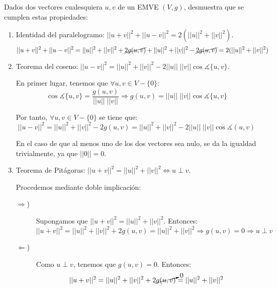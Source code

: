 \begin{ejercicio}
    Dados dos vectores cualesquiera $u,v$ de un EMVE $(V,g)$, desmuestra que se cumplen estas propiedades:
    \begin{enumerate}
        \item Identidad del paralelogramo: $||u+v||^2 +||u-v||^2 = 2\left(||u||^2 + ||v||^2\right)$.
        \begin{equation*}
            ||u+v||^2 + ||u-v||^2 = ||u||^2 + ||v||^2 + \cancel{2g(u,v)} + ||u||^2 + ||v||^2 - \cancel{2g(u,v)} = 2(||u||^2 + ||v||^2)
        \end{equation*}

        \item Teorema del coseno: $||u-v||^2 = ||u||^2+||v||^2 -2||u||\;||v||\cos \measuredangle \{u,v\}$.

        En primer lugar, tenemos que $\forall u,v\in V-\{0\}$:
        \begin{equation*}
            \cos \measuredangle \{u,v\} = \frac{g(u,v)}{||u||\;||v||} \Longrightarrow g(u,v) = ||u||\;||v|| \cos \measuredangle \{u,v\} 
        \end{equation*}

        Por tanto, $\forall u,v\in V-\{0\}$ se tiene que:
        \begin{equation*}
            ||u-v||^2 = ||u||^2 + ||v||^2 -2g(u,v) = ||u||^2+||v||^2 -2||u||\;||v||\cos \measuredangle (u,v)
        \end{equation*}

        En el caso de que al menos uno de los dos vectores sea nulo, se da la igualdad trivialmente, ya que $||0||=0$.

        \item Teorema de Pitágoras: $||u+v||^2 = ||u||^2 + ||v||^2 \Longleftrightarrow u\perp v$.

        Procedemos mediante doble implicación:
        \begin{description}
            \item [$\Longrightarrow$)] Supongamos que $||u+v||^2 = ||u||^2 + ||v||^2$. Entonces:
            \begin{equation*}
                ||u+v||^2 = ||u||^2 + ||v||^2 +2g(u,v) = ||u||^2 + ||v||^2 \Longrightarrow g(u,v)=0 \Longrightarrow u\perp v
            \end{equation*}

            \item [$\Longleftarrow$)] Como $u\perp v$, tenemos que $g(u,v)=0$. Entonces:
            \begin{equation*}
                ||u+v||^2 = ||u||^2 + ||v||^2 +2\cancelto{0}{g(u,v)} = ||u||^2 + ||v||^2
            \end{equation*}
            

\end{description}
\end{enumerate}
\end{ejercicio}
